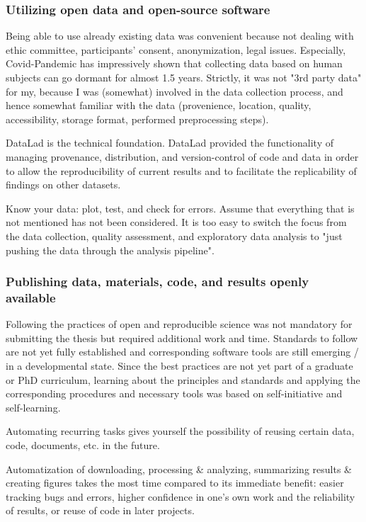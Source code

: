 \subsubsection{Utilizing open data and open-source software}
%
Being able to use already existing data was convenient because not dealing with
ethic committee, participants' consent, anonymization, legal issues.
%
Especially, Covid-Pandemic has impressively shown that collecting data based on
human subjects can go dormant for almost 1.5 years.
%
Strictly, it was not "3rd party data" for my, because I was (somewhat) involved
in the data collection process, and hence somewhat familiar with the data
(provenience, location, quality, accessibility, storage format, performed
preprocessing steps).

DataLad \citet{halchenko2021datalad} is the technical foundation.
%
DataLad provided the functionality of managing provenance, distribution, and
version-control of code and data in order to allow the reproducibility of
current results and to facilitate the replicability of findings on other
datasets.


%
Know your data: plot, test, and check for errors.
%
Assume that everything that is not mentioned has not been considered.
%
It is too easy to switch the focus from the data collection, quality assessment,
and exploratory data analysis to "just pushing the data through the analysis
pipeline".



\subsubsection{Publishing data, materials, code, and results openly available}

%
Following the practices of open and reproducible science was not mandatory for
submitting the thesis but required additional work and time.
%
Standards to follow are not yet fully established and corresponding software
tools are still emerging / in a developmental state.
%
Since the best practices are not yet part of a graduate or PhD curriculum,
learning about the principles and standards and applying the corresponding
procedures and necessary tools was based on self-initiative and self-learning.

Automating recurring tasks gives yourself the possibility of reusing
certain data, code, documents, etc. in the future.

%
Automatization of downloading, processing \& analyzing, summarizing
results \& creating figures takes the most time compared to its immediate
benefit:
%
easier tracking bugs and errors, higher confidence in one's own work and the
reliability of results, or reuse of code in later projects.




